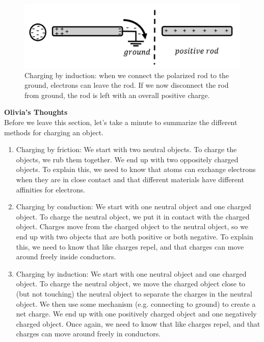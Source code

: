 \begin{figure}[!htbp]
\centering
\includegraphics[width=0.9\linewidth]{files/inductioncharge-7664b6a2f86d0f9e6767bf0ce16ca03e.png}
\caption[]{Charging by induction: when we connect the polarized rod to the ground, electrons can leave the rod. If we now disconnect the rod from ground, the rod is left with an overall positive charge.}
\label{fig:chargesfields:inductioncharge}
\end{figure}

\begin{framed}
\textbf{Olivia's Thoughts}\\
Before we leave this section, let's take a minute to summarize the different methods for charging an object.

\begin{enumerate}
\item Charging by friction: We start with two neutral objects. To charge the objects, we rub them together. We end up with two oppositely charged objects. To explain this, we need to know that atoms can exchange electrons when they are in close contact and that different materials have different affinities for electrons.
\item Charging by conduction: We start with one neutral object and one charged object. To charge the neutral object, we put it in contact with the charged object. Charges move from the charged object to the neutral object, so we end up with two objects that are both positive or both negative. To explain this, we need to know that like charges repel, and that charges can move around freely inside conductors.
\item Charging by induction: We start with one neutral object and one charged object. To charge the neutral object, we move the charged object close to (but not touching) the neutral object to separate the charges in the neutral object. We then use some mechanism (e.g. connecting to ground) to create a net charge. We end up with one positively charged object and one negatively charged object. Once again, we need to know that like charges repel, and that charges can move around freely in conductors.
\end{enumerate}
\end{framed}


